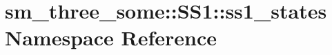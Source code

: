 \hypertarget{namespacesm__three__some_1_1SS1_1_1ss1__states}{}\section{sm\+\_\+three\+\_\+some\+:\+:S\+S1\+:\+:ss1\+\_\+states Namespace Reference}
\label{namespacesm__three__some_1_1SS1_1_1ss1__states}
